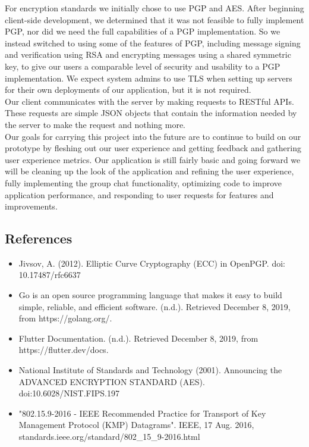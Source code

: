 \documentclass[11pt]{article}
\begin{document}
For encryption standards we initially chose to use PGP and AES. After beginning client-side development, we determined that it was not feasible to fully implement PGP, nor did we need the full capabilities of a PGP implementation. So we instead switched to using some of the features of PGP, including message signing and verification using RSA and encrypting messages using a shared symmetric key, to give our users a comparable level of security and usability to a PGP implementation. We expect system admins to use TLS when setting up servers for their own deployments of our application, but it is not required. \\

Our client communicates with the server by making requests to RESTful APIs. These requests are simple JSON objects that contain the information needed by the server to make the request and nothing more. \\

Our goals for carrying this project into the future are to continue to build on our prototype by fleshing out our user experience and getting feedback and gathering user experience metrics. Our application is still fairly basic and going forward we will be cleaning up the look of the application and refining the user experience, fully implementing the group chat functionality, optimizing code to improve application performance, and responding to user requests for features and improvements.\\


\subsection{References}
\begin{itemize}
	\item{Jivsov, A. (2012). Elliptic Curve Cryptography (ECC) in OpenPGP. doi: 10.17487/rfc6637}
	\item{Go is an open source programming language that makes it easy to build simple, reliable, and efficient software. (n.d.). Retrieved December 8, 2019, from https://golang.org/.}
	\item{Flutter Documentation. (n.d.). Retrieved December 8, 2019, from https://flutter.dev/docs.}
	\item{National Institute of Standards and Technology (2001). Announcing the ADVANCED ENCRYPTION STANDARD (AES). doi:10.6028/NIST.FIPS.197}
	\item{"802.15.9-2016 - IEEE Recommended Practice for Transport of Key Management Protocol (KMP) Datagrams". IEEE, 17 Aug. 2016, standards.ieee.org/standard/802\_15\_9-2016.html}
\end{itemize}
\end{document}
